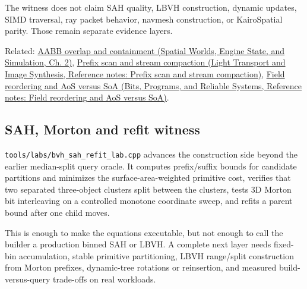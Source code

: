 The witness does not claim SAH quality, LBVH construction, dynamic updates, SIMD traversal, ray packet behavior, navmesh construction, or KairoSpatial parity. Those remain separate evidence layers.

Related: \href{../05-Spatial-Worlds-Engine-State-and-Simulation/main.pdf\#nameddest=03-visual-computing-i-ch021-axis-aligned-bounding-boxes}{AABB overlap and containment (Spatial Worlds, Engine State, and Simulation, Ch. 2)}, \href{../04-Light-Transport-and-Image-Synthesis/main.pdf\#nameddest=appendix-f2ee4d086415}{Prefix scan and stream compaction (Light Transport and Image Synthesis, Reference notes: Prefix scan and stream compaction)}, \href{../01-Bits-Programs-and-Reliable-Systems/main.pdf\#nameddest=appendix-5522ad176ca0}{Field reordering and AoS versus SoA (Bits, Programs, and Reliable Systems, Reference notes: Field reordering and AoS versus SoA)}.

\subsection{SAH, Morton and refit witness}\label{appendix-5653a7aea6bb-sah-morton-and-refit-witness}

\texttt{tools/labs/bvh\_sah\_refit\_lab.cpp} advances the construction side beyond the earlier median-split query oracle. It computes prefix/suffix bounds for candidate partitions and minimizes the surface-area-weighted primitive cost, verifies that two separated three-object clusters split between the clusters, tests 3D Morton bit interleaving on a controlled monotone coordinate sweep, and refits a parent bound after one child moves.

This is enough to make the equations executable, but not enough to call the builder a production binned SAH or LBVH. A complete next layer needs fixed-bin accumulation, stable primitive partitioning, LBVH range/split construction from Morton prefixes, dynamic-tree rotations or reinsertion, and measured build-versus-query trade-offs on real workloads.
